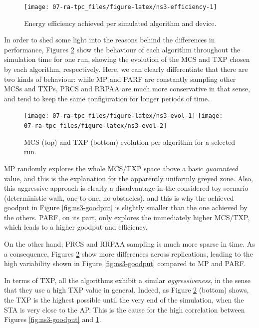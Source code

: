\documentclass[twoside,nohyper]{tufte-book}
\begin{document}
\begin{figure}

{\centering \texttt{[image: 07-ra-tpc\_files/figure-latex/ns3-efficiency-1]} 

}

\caption[Energy efficiency achieved per simulated algorithm and device.]{Energy efficiency achieved per simulated algorithm and device.}\label{fig:ns3-efficiency}
\end{figure}

In order to shed some light into the reasons behind the differences in performance, Figures \ref{fig:ns3-evol} show the behaviour of each algorithm throughout the simulation time for one run, showing the evolution of the MCS and TXP chosen by each algorithm, respectively. Here, we can clearly differentiate that there are two kinds of behaviour: while MP and PARF are constantly sampling other MCSs and TXPs, PRCS and RRPAA are much more conservative in that sense, and tend to keep the same configuration for longer periods of time.



\begin{figure}

{\centering \texttt{[image: 07-ra-tpc\_files/figure-latex/ns3-evol-1]} \texttt{[image: 07-ra-tpc\_files/figure-latex/ns3-evol-2]} 

}

\caption[MCS (top) and TXP (bottom) evolution per algorithm for a selected run.]{MCS (top) and TXP (bottom) evolution per algorithm for a selected run.}\label{fig:ns3-evol}
\end{figure}

MP randomly explores the whole MCS/TXP space above a basic \emph{guaranteed} value, and this is the explanation for the apparently uniformly greyed zone. Also, this aggressive approach is clearly a disadvantage in the considered toy scenario (deterministic walk, one-to-one, no obstacles), and this is why the achieved goodput in Figure \ref{fig:ns3-goodput} is slightly smaller than the one achieved by the others. PARF, on its part, only explores the immediately higher MCS/TXP, which leads to a higher goodput and efficiency.

On the other hand, PRCS and RRPAA sampling is much more sparse in time. As a consequence, Figures \ref{fig:ns3-evol} show more differences across replications, leading to the high variability shown in Figure \ref{fig:ns3-goodput} compared to MP and PARF.

In terms of TXP, all the algorithms exhibit a similar \emph{aggressiveness}, in the sense that they use a high TXP value in general. Indeed, as Figure \ref{fig:ns3-evol} (bottom) shows, the TXP is the highest possible until the very end of the simulation, when the STA is very close to the AP. This is the cause for the high correlation between Figures \ref{fig:ns3-goodput} and \ref{fig:ns3-efficiency}.
\end{document}
